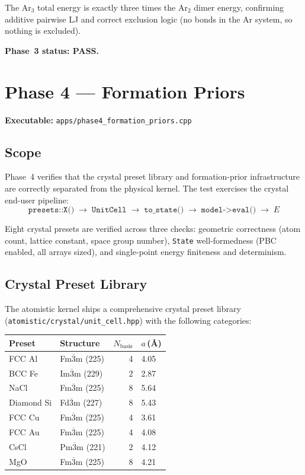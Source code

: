 \documentclass[11pt]{article}
\begin{document}
The Ar$_3$ total energy is exactly three times the Ar$_2$ dimer energy,
confirming additive pairwise LJ and correct exclusion logic (no bonds in
the Ar system, so nothing is excluded).

\textbf{Phase~3 status: PASS.}

\section{Phase 4 --- Formation Priors}

\textbf{Executable:} \texttt{apps/phase4\_formation\_priors.cpp}

\subsection{Scope}

Phase~4 verifies that the crystal preset library and formation-prior
infrastructure are correctly separated from the physical kernel.  The
test exercises the crystal end-user pipeline:
\[
\texttt{presets::X()} \;\to\; \texttt{UnitCell}
    \;\to\; \texttt{to\_state()} \;\to\; \texttt{model->eval()} \;\to\; E
\]

Eight crystal presets are verified across three checks: geometric
correctness (atom count, lattice constant, space group number),
\texttt{State} well-formedness (PBC enabled, all arrays sized),
and single-point energy finiteness and determinism.

\subsection{Crystal Preset Library}

The atomistic kernel ships a comprehensive crystal preset library
(\texttt{atomistic/crystal/unit\_cell.hpp}) with the following categories:

\begin{center}
\begin{tabular}{llrl}
\toprule
Preset & Structure & $N_{\mathrm{basis}}$ & $a$\,(\AA) \\
\midrule
FCC Al  & Fm$\overline{3}$m (225) & 4 & 4.05 \\
BCC Fe  & Im$\overline{3}$m (229) & 2 & 2.87 \\
NaCl    & Fm$\overline{3}$m (225) & 8 & 5.64 \\
Diamond Si & Fd$\overline{3}$m (227) & 8 & 5.43 \\
FCC Cu  & Fm$\overline{3}$m (225) & 4 & 3.61 \\
FCC Au  & Fm$\overline{3}$m (225) & 4 & 4.08 \\
CsCl    & Pm$\overline{3}$m (221) & 2 & 4.12 \\
MgO     & Fm$\overline{3}$m (225) & 8 & 4.21 \\
\bottomrule
\end{tabular}
\end{center}
\end{document}
